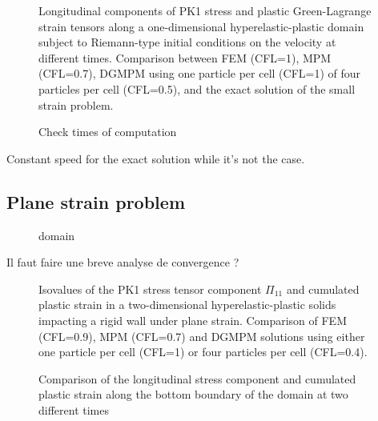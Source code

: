 \begin{figure}[ht]
  \centering
  
  \label{fig:hep_planeWave}
  \caption{Longitudinal components of PK1 stress and plastic Green-Lagrange strain tensors along a one-dimensional hyperelastic-plastic domain subject to Riemann-type initial conditions on the velocity at different times. Comparison between FEM (CFL=1), MPM (CFL=0.7), DGMPM using one particle per cell (CFL=1) of four particles per cell (CFL=0.5), and the exact solution of the small strain problem.}
\end{figure}

\begin{figure}[ht]
  \centering
  
  \label{fig:hep_planeWave_high}
  \caption{Check times of computation}
\end{figure}
Constant speed for the exact solution while it's not the case.

\subsection{Plane strain problem}
\label{sec:plane-strain-problem}

\begin{figure}[ht]
  \centering
  \caption{domain}
  \label{fig:PS_domain}
\end{figure}


Il faut faire une breve analyse de convergence ?

\begin{figure}[ht]
  \centering
  \caption{Isovalues of the PK1 stress tensor component $\Pi_{11}$ and cumulated plastic strain in a two-dimensional hyperelastic-plastic solids impacting a rigid wall under plane strain. Comparison of FEM (CFL=0.9), MPM (CFL=0.7) and DGMPM solutions using either one particle per cell (CFL=1) or four particles per cell (CFL=0.4).}
  \label{fig:test}
\end{figure}


\begin{figure}[ht]
  \centering
  
  \caption{Comparison of the longitudinal stress component and cumulated plastic strain along the bottom boundary of the domain at two different times}
  \label{fig:bottom_line}
\end{figure}

